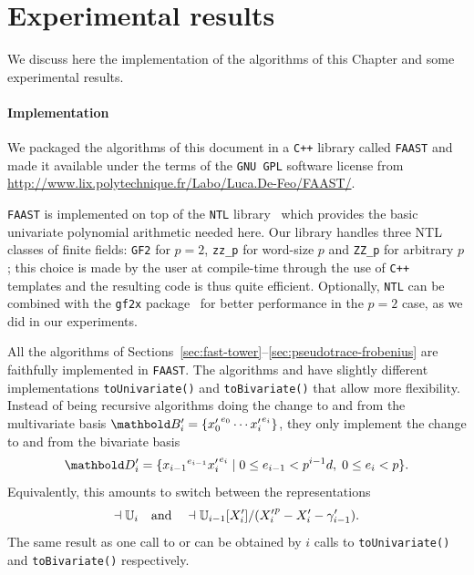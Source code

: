 \section{Experimental results}
\label{sec:artin-benchmarks}

We discuss here the implementation of the algorithms of this Chapter
and some experimental results.

\paragraph{Implementation}
We packaged the algorithms of this document in a \texttt{C++} library
called \texttt{FAAST} and made it available under the terms of the
\texttt{GNU GPL} software license from
\url{http://www.lix.polytechnique.fr/Labo/Luca.De-Feo/FAAST/}.

\texttt{FAAST} is implemented on top of the \texttt{NTL}
library~\cite{shoup2003ntl} which provides the basic univariate
polynomial arithmetic needed here. Our library handles three NTL
classes of finite fields: \texttt{GF2} for $p=2$, \texttt{zz\_p} for
word-size $p$ and \texttt{ZZ\_p} for arbitrary $p$; this choice is made
by the user at compile-time through the use of \texttt{C++} templates
and the resulting code is thus quite efficient.  Optionally,
\texttt{NTL} can be combined with the \texttt{gf2x}
package~\cite{gf2x} for better performance in the $p=2$ case, as we
did in our experiments.

All the algorithms of
Sections~\ref{sec:fast-tower}--\ref{sec:pseudotrace-frobenius} are
faithfully implemented in \texttt{FAAST}. The algorithms
 and  have
slightly different implementations \texttt{toUnivariate()} and
\texttt{toBivariate()} that allow more flexibility. Instead of being
recursive algorithms doing the change to and from the multivariate
basis $\basis{B}'_i=\{{x_0'}^{e_0}\cdots {x_i'}^{e_i}\}$, they only
implement the change to and from the bivariate basis
\begin{equation}
  \label{eq:278}
  \basis{D}'_i=\{{x_{i-1}}^{e_{i-1}}{x_i'}^{e_i} \;|\;0\le
  e_{i-1}<p^{i-1}d,\; 0\le e_i<p\}
  \text{.}
\end{equation}
Equivalently, this amounts to
switch between the representations
\begin{equation}
  \dashv\mathbb{U}_i \quad\text{and}\quad
  \dashv\mathbb{U}_{i-1}[X_i']/({X_i'}^p-X_i'-\gamma_{i-1}')
  \text{.}
\end{equation}
The same result as one call to  or
 can be obtained by $i$ calls to
\texttt{toUnivariate()} and \texttt{toBivariate()} respectively.

